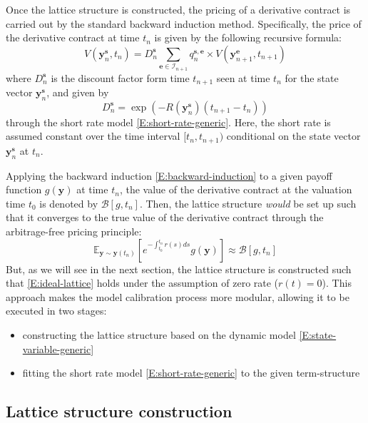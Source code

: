 \documentclass{texyise}
\newcommand{\indexset}{\mathcal{I}}
\newcommand{\valuebackward}{\mathcal{B}}
\begin{document}
Once the lattice structure is constructed, the pricing of a derivative contract is carried out by the standard backward induction method. Specifically, the price of the derivative contract at time $t_n$ is given by the following recursive formula:
\begin{equation}
    V(\bm{y}_{n}^{\bm{s}}, t_n) = D_n^{\bm{s}}\sum_{\bm{e} \in \indexset_{n+1}} q_{n}^{\bm{s},\bm{e}} \times V(\bm{y}_{n+1}^{\bm{e}}, t_{n+1}) \label{E:backward-induction}
\end{equation}
where $D_n^{\bm{s}}$ is the discount factor form time $t_{n+1}$ seen at time $t_{n}$ for the state vector $\bm{y}_n^{\bm{s}}$, and given by
\begin{equation}
    D_n^{\bm{s}} = \exp\left(-R(\bm{y}_n^{\bm{s}}) (t_{n+1} -t_n) \right)
    \label{E:discount-factor-node}
\end{equation}
through the short rate model \eqref{E:short-rate-generic}. Here, the short rate is assumed constant over the time interval $[t_n, t_{n+1})$ conditional on the state vector $\bm{y}_n^{\bm{s}}$ at $t_{n}$.

Applying the backward induction \eqref{E:backward-induction} to a given payoff function $g(\bm{y})$ at time $t_n$, the value of the derivative contract at the valuation time $t_0$ is denoted by $\valuebackward[g, t_n]$. Then, the lattice structure {\em would} be set up such that it converges to the true value of the derivative contract through the arbitrage-free pricing principle:
\begin{equation}
    \mathbb{E}_{\bm{y} \sim \bm{y}(t_n)}\left[ e^{-\int_{t_0}^{t_n} r(s)ds} g(\bm{y}) \right] \approx \valuebackward[g,t_n] \label{E:ideal-lattice}
\end{equation}
But, as we will see in the next section, the lattice structure is constructed such that \eqref{E:ideal-lattice} holds under the assumption of zero rate ($r(t) = 0$). This approach makes the model calibration process more modular, allowing it to be executed in two stages:
\begin{itemize}
    \item constructing the lattice structure based on the dynamic model \eqref{E:state-variable-generic}
    \item fitting the short rate model \eqref{E:short-rate-generic} to the given term-structure
\end{itemize}

\subsection{Lattice structure construction}
\label{S:lattice-structure-construction}
\end{document}
